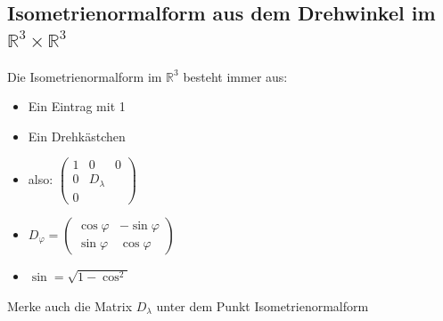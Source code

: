 \documentclass[a4paper,portrait]{scrartcl}
\begin{document}
\subsection{Isometrienormalform aus dem Drehwinkel im $\mathbb{R}^3\times\mathbb{R}^3$}
Die Isometrienormalform im $\mathbb{R}^3$ besteht immer aus:
\begin{itemize}
	\item Ein Eintrag mit 1
	\item Ein Drehkästchen
	\item also: $\begin{pmatrix}
1&0&0 \\
0&D_\lambda&\\
0&&
\end{pmatrix}$
	\item $D_\varphi = \begin{pmatrix}
\cos \varphi & -\sin \varphi \\
\sin \varphi & \cos \varphi
\end{pmatrix}$
	\item $\sin = \sqrt{1-\cos^2}$
\end{itemize}
Merke auch die Matrix $D_\lambda$ unter dem Punkt Isometrienormalform
\end{document}
